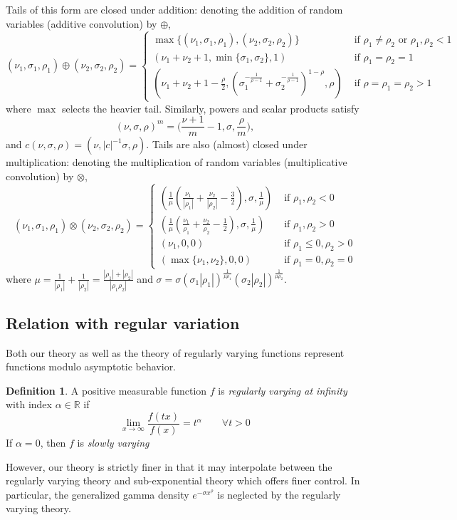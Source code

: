 \documentclass{article}
\theoremstyle{definition}
\newtheorem{definition}{Definition}
\begin{document}
Tails of this form are  closed under addition: denoting the addition of random variables (additive convolution) by $\oplus$,
\[
(\nu_{1},\sigma_{1},\rho_{1})\oplus(\nu_{2},\sigma_{2},\rho_{2})
=\begin{cases}
\max\{(\nu_{1},\sigma_{1},\rho_{1}),(\nu_{2},\sigma_{2},\rho_{2})\} & \text{ if }\rho_{1}\neq\rho_{2}\text{ or }\rho_{1},\rho_{2}<1\\
\left(\nu_{1}+\nu_{2}+1,\min\{\sigma_{1},\sigma_{2}\},1\right) & \text{ if }\rho_{1}=\rho_{2}=1\\
(\nu_{1}+\nu_{2}+1-\frac{\rho}{2},(\sigma_{1}^{-\frac{1}{\rho-1}}+\sigma_{2}^{-\frac{1}{\rho-1}})^{1-\rho},\rho) & \text{ if }\rho=\rho_{1}=\rho_{2}>1
\end{cases}
\]
where $\max$ selects the heavier tail. Similarly, powers and scalar products satisfy
\[
(\nu,\sigma,\rho)^m = \bigg(\frac{\nu+1}{m} - 1, \sigma, \frac{\rho}{m}\bigg),
\]
and $c(\nu,\sigma,\rho) = (\nu,|c|^{-1} \sigma,\rho)$. 
Tails are also (almost) closed under multiplication: denoting the multiplication of random variables (multiplicative convolution) by $\otimes$,
\[
(\nu_{1},\sigma_{1},\rho_{1})\otimes(\nu_{2},\sigma_{2},\rho_{2})
=\begin{cases}
\left(\frac{1}{\mu}\left(\frac{\nu_{1}}{|\rho_{1}|}+\frac{\nu_{2}}{|\rho_{2}|}-\frac{3}{2}\right),\sigma,\frac{1}{\mu}\right) & \text{ if }\rho_{1},\rho_{2}<0\\
\left(\frac{1}{\mu}\left(\frac{\nu_{1}}{\rho_{1}}+\frac{\nu_{2}}{\rho_{2}}-\frac{1}{2}\right),\sigma,\frac{1}{\mu}\right) & \text{ if }\rho_{1},\rho_{2}>0\\
(\nu_{1},0,0) & \mbox{ if }\rho_{1}\leq0,\rho_{2}>0 \\
(\max\{\nu_1,\nu_2\},0,0) & \mbox{ if }\rho_{1}=0,\rho_{2}=0
\end{cases}
\]
where $\mu=\frac{1}{|\rho_{1}|}+\frac{1}{|\rho_{2}|}=\frac{|\rho_{1}|+|\rho_{2}|}{|\rho_{1}\rho_{2}|}$ and $\sigma=\sigma(\sigma_{1}|\rho_{1}|)^{\frac{1}{\mu\rho_{1}}}(\sigma_{2}|\rho_{2}|)^{\frac{1}{\mu\rho_{2}}}$. 

\subsection{Relation with regular variation}

Both our theory as well as the theory of regularly varying functions represent functions modulo
asymptotic behavior.
\begin{definition}
    A positive measurable function $f$ is \emph{regularly varying at infinity} with index $\alpha \in \mathbb{R}$ if
    \[
        \lim_{x \to \infty} \frac{f(tx)}{f(x)} = t^{\alpha}\qquad\forall t > 0
    \]
    If $\alpha = 0$, then $f$ is \emph{slowly varying}
\end{definition}
However, our theory is strictly finer in that it may interpolate between
the regularly varying theory and sub-exponential theory which offers finer control. In particular, the
generalized gamma density $e^{-\sigma x^\rho}$ is neglected by the regularly varying theory.
\end{document}
